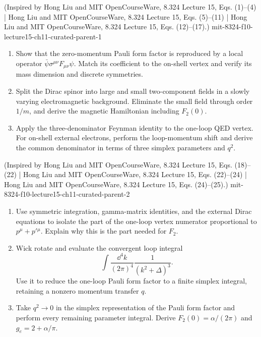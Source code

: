 \begin{enumerate}
  {(Inspired by Hong Liu and MIT OpenCourseWare, 8.324 Lecture 15, Eqs. (1)--(4) | Hong Liu and MIT OpenCourseWare, 8.324 Lecture 15, Eqs. (5)--(11) | Hong Liu and MIT OpenCourseWare, 8.324 Lecture 15, Eqs. (12)--(17).)}
  {mit-8324-f10-lecture15-ch11-curated-parent-1}
\begin{enumerate}
\item
Show that the zero-momentum Pauli form factor is reproduced by a local
operator \(\bar\psi\sigma^{\mu\nu}F_{\mu\nu}\psi\).  Match its coefficient
to the on-shell vertex and verify its mass dimension and discrete
symmetries.
\item
Split the Dirac spinor into large and small two-component fields in a slowly
varying electromagnetic background.  Eliminate the small field through
order \(1/m\), and derive the magnetic Hamiltonian including \(F_2(0)\).
\item
Apply the three-denominator Feynman identity to the one-loop QED vertex.
For on-shell external electrons, perform the loop-momentum shift and derive
the common denominator in terms of three simplex parameters and \(q^2\).
\end{enumerate}

  {(Inspired by Hong Liu and MIT OpenCourseWare, 8.324 Lecture 15, Eqs. (18)--(22) | Hong Liu and MIT OpenCourseWare, 8.324 Lecture 15, Eqs. (22)--(24) | Hong Liu and MIT OpenCourseWare, 8.324 Lecture 15, Eqs. (24)--(25).)}
  {mit-8324-f10-lecture15-ch11-curated-parent-2}
\begin{enumerate}
\item
Use symmetric integration, gamma-matrix identities, and the external Dirac
equations to isolate the part of the one-loop vertex numerator proportional
to \(p^\mu+p'{}^\mu\).  Explain why this is the part needed for \(F_2\).
\item
Wick rotate and evaluate the convergent loop integral
\[
 \int\frac{\dd^4k}{(2\pi)^4}\frac{1}{(k^2+\Delta)^3}.
\]
Use it to reduce the one-loop Pauli form factor to a finite simplex
integral, retaining a nonzero momentum transfer \(q\).
\item
Take \(q^2\to0\) in the simplex representation of the Pauli form factor and
perform every remaining parameter integral.  Derive
\(F_2(0)=\alpha/(2\pi)\) and \(g_e=2+\alpha/\pi\).
\end{enumerate}
\end{enumerate}
